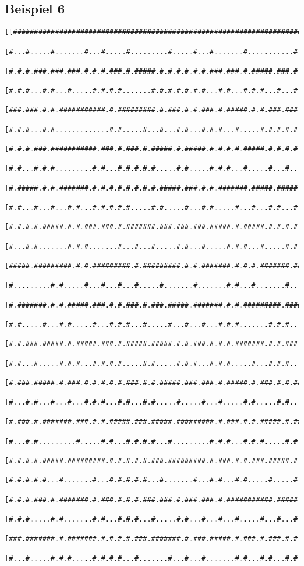 \documentclass[a4paper,10pt,ngerman]{scrartcl}
\begin{document}
\subsection{Beispiel 6}
\begin{lstlisting}[frame=tb]
[[#################################################################################]
 [#...#.....#.......#...#.....#.........#.....#...#.......#...........#.........#.#]
 [#.#.#.###.###.###.#.#.#.###.#.#####.#.#.#.#.#.#.###.###.#.#####.###.#.#####.#.#.#]
 [#.#.#...#.#...#.....#.#.#.#.......#.#.#.#.#.#.#...#.#...#.#.#...#...#.#.#...#...#]
 [###.###.#.#.###########.#.#########.#.###.#.#.###.#.#####.#.#.###.###.#.#.#######]
 [#.#.#...#.#.............#.#.....#...#...#.#...#.#.#...#.....#.#.#.#.#.#.#.......#]
 [#.#.#.###.###########.###.#.###.#.#####.#.#####.#.#.#.#.#####.#.#.#.#.#.#######.#]
 [#.#...#.#.#.........#.#...#.#.#.#.#.....#.#.....#.#.#...#.....#...#...#.#.......#]
 [#.#####.#.#.#######.#.#.#.#.#.#.#.#.#####.###.#.#.#######.#####.#####.#.#.#######]
 [#.#...#...#...#.#...#.#.#.#.#.....#.#.....#...#.#.....#...#...#.#...#...#.......#]
 [#.#.#.#.#####.#.#.###.###.#.#######.###.###.###.#####.#.#####.#.#.#.#.#########.#]
 [#...#.#.......#.#.#.......#...#...#.....#.#...#.....#.#.#...#.....#.#.#...#...#.#]
 [#####.#########.#.#.#########.#.#########.#.#.#######.#.#.#.#######.###.#.#.#.#.#]
 [#.........#.#.....#...#...#...#.....#.......#.......#.#...#.......#.....#.#.#.#.#]
 [#.#######.#.#.#####.###.#.#.###.#.###.#####.#######.#.#.#########.#######.#.#.#.#]
 [#.#.....#...#.#.....#...#.#.#...#.....#...#...#...#.#.#.......#.#.#.....#.#.#...#]
 [#.#.###.#####.#.#####.###.#.#####.#####.#.#.###.#.#.#.#######.#.#.###.#.#.#.#####]
 [#.#...#.....#.#.#...#.#.#.#.....#.#.....#.#.#...#.#.#.....#...#.#.#...#.#.#.....#]
 [#.###.#####.#.###.#.#.#.#.#.###.#.#.#####.###.###.#.#####.#.###.#.#.#####.#####.#]
 [#...#.#...#...#...#.#.#...#.#...#.#.....#.....#...#.....#.#.....#.#.......#...#.#]
 [#.###.#.#######.###.#.#.#####.###.#####.#########.#.###.#.#.#####.#.#######.#.#.#]
 [#...#.#.........#.....#.#...#.#.#.#...#.........#.#.#...#.#.#.....#.#...#...#...#]
 [#.#.#.#.#####.#########.#.#.#.#.#.###.#########.#.###.#.#.###.#####.#.#.#.#.#####]
 [#.#.#.#.#...#.......#...#.#.#.#.#...#.......#...#.#...#.#.....#.....#.#.#.#.....#]
 [#.#.#.###.#.#######.#.###.#.#.#.###.###.#.###.###.#.###########.#####.#.#######.#]
 [#.#.#.....#.#.......#.#...#.#.#...#.....#.#...#...#...#.....#...#...#.#.........#]
 [###.#######.#.#######.#.#.#.#.###.#######.#.###.#####.#.###.#.###.#.#.###########]
 [#...#.....#.#.#.....#.#.#.#...#.......#...#...#.......#.#...#.#...#.#...........#]

\end{lstlisting}
\end{document}
